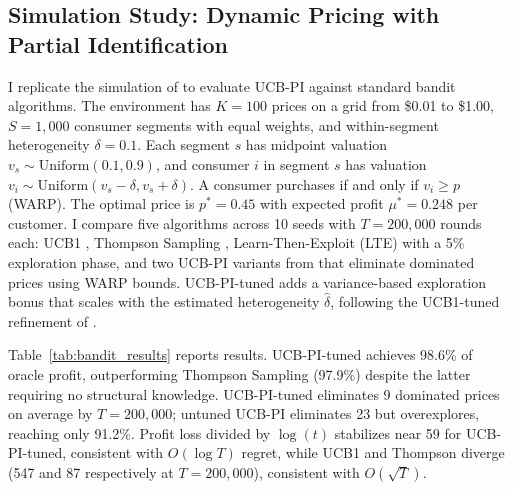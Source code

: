 \subsection{Simulation Study: Dynamic Pricing with Partial Identification}
\label{sec:bandit_sim_misra}

I replicate the simulation of \citet{Misra2019} to evaluate UCB-PI against standard bandit algorithms. The environment has $K = 100$ prices on a grid from \$0.01 to \$1.00, $S = 1{,}000$ consumer segments with equal weights, and within-segment heterogeneity $\delta = 0.1$. Each segment $s$ has midpoint valuation $v_s \sim \mathrm{Uniform}(0.1, 0.9)$, and consumer $i$ in segment $s$ has valuation $v_i \sim \mathrm{Uniform}(v_s - \delta, v_s + \delta)$. A consumer purchases if and only if $v_i \geq p$ (WARP). The optimal price is $p^* = 0.45$ with expected profit $\mu^* = 0.248$ per customer. I compare five algorithms across 10 seeds with $T = 200{,}000$ rounds each: UCB1 \citep{auer2002}, Thompson Sampling \citep{Thompson1933}, Learn-Then-Exploit (LTE) with a 5\% exploration phase, and two UCB-PI variants from \citet{Misra2019} that eliminate dominated prices using WARP bounds. UCB-PI-tuned adds a variance-based exploration bonus that scales with the estimated heterogeneity $\hat{\delta}$, following the UCB1-tuned refinement of \citet{auer2002}.

Table~\ref{tab:bandit_results} reports results. UCB-PI-tuned achieves 98.6\% of oracle profit, outperforming Thompson Sampling (97.9\%) despite the latter requiring no structural knowledge. UCB-PI-tuned eliminates 9 dominated prices on average by $T = 200{,}000$; untuned UCB-PI eliminates 23 but overexplores, reaching only 91.2\%. Profit loss divided by $\log(t)$ stabilizes near 59 for UCB-PI-tuned, consistent with $O(\log T)$ regret, while UCB1 and Thompson diverge (547 and 87 respectively at $T = 200{,}000$), consistent with $O(\sqrt{T})$.

